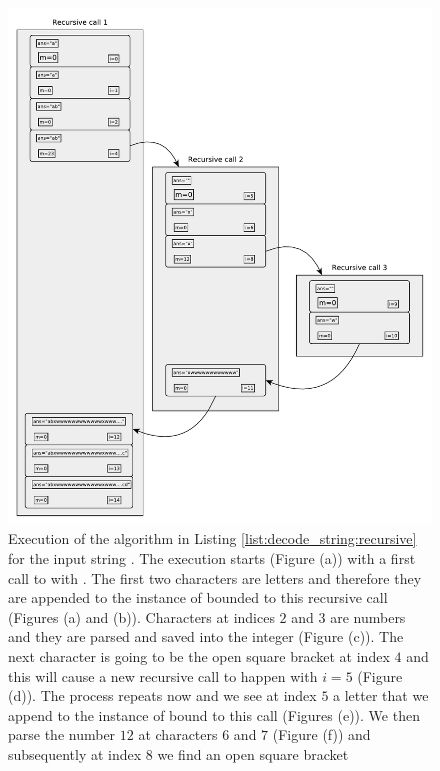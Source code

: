 \begin{figure}
	\captionsetup{font=footnotesize,labelfont=footnotesize}
	\centering
	\includegraphics[width=\textwidth]{sources/decode_string/images/recursion}
   \caption{Execution of the algorithm in Listing \ref{list:decode_string:recursive} for the input
	string . The execution starts (Figure (a)) with a first call to
	 with . The first two characters are letters
	and therefore they are appended to the instance of  bounded to this recursive call
	(Figures (a) and (b)). Characters at indices $2$ and $3$ are numbers and they are parsed and
	saved into the integer  (Figure (c)). The next character is going to be the open
	square bracket at index $4$  and this will cause a new recursive call to happen with $i=5$
	(Figure (d)). The process repeats now and we see at index $5$ a letter that we append to the
	instance of  bound to this call (Figures (e)). We then parse the number $12$ at
	characters $6$ and $7$ (Figure (f)) and subsequently at index $8$ we find an open square bracket
}
\end{figure}

